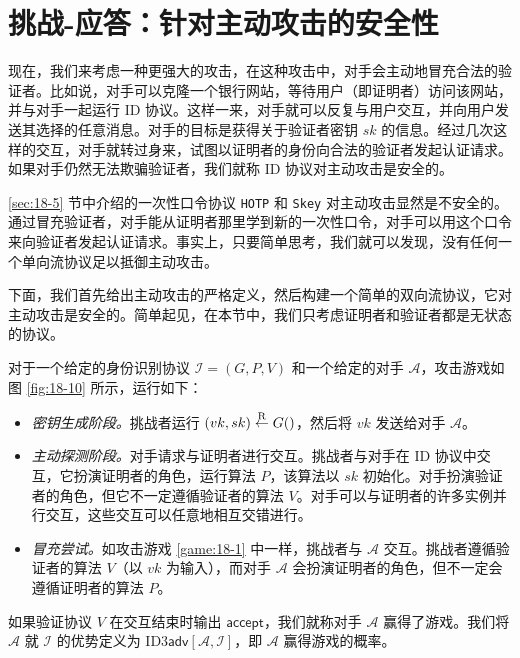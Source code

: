 \section{挑战-应答：针对主动攻击的安全性}\label{sec:18-6}


现在，我们来考虑一种更强大的攻击，在这种攻击中，对手会主动地冒充合法的验证者。比如说，对手可以克隆一个银行网站，等待用户（即证明者）访问该网站，并与对手一起运行 ID 协议。这样一来，对手就可以反复与用户交互，并向用户发送其选择的任意消息。对手的目标是获得关于验证者密钥 $sk$ 的信息。经过几次这样的交互，对手就转过身来，试图以证明者的身份向合法的验证者发起认证请求。如果对手仍然无法欺骗验证者，我们就称 ID 协议对主动攻击是安全的。

\ref{sec:18-5} 节中介绍的一次性口令协议 \texttt{HOTP} 和 \texttt{Skey} 对主动攻击显然是不安全的。通过冒充验证者，对手能从证明者那里学到新的一次性口令，对手可以用这个口令来向验证者发起认证请求。事实上，只要简单思考，我们就可以发现，没有任何一个单向流协议足以抵御主动攻击。

下面，我们首先给出主动攻击的严格定义，然后构建一个简单的双向流协议，它对主动攻击是安全的。简单起见，在本节中，我们只考虑证明者和验证者都是无状态的协议。

\begin{game}\label{game:18-3}
对于一个给定的身份识别协议 $\mathcal{I}=(G,P,V)$ 和一个给定的对手 $\mathcal{A}$，攻击游戏如图 \ref{fig:18-10} 所示，运行如下：
\begin{itemize}
	\item \emph{密钥生成阶段。}挑战者运行 $(vk,sk)\overset{\rm R}\leftarrow G()$，然后将 $vk$ 发送给对手 $\mathcal{A}$。
	\item \emph{主动探测阶段。}对手请求与证明者进行交互。挑战者与对手在 ID 协议中交互，它扮演证明者的角色，运行算法 $P$，该算法以 $sk$ 初始化。对手扮演验证者的角色，但它不一定遵循验证者的算法 $V$。对手可以与证明者的许多实例并行交互，这些交互可以任意地相互交错进行。
	\item \emph{冒充尝试。}如攻击游戏 \ref{game:18-1} 中一样，挑战者与 $\mathcal{A}$ 交互。挑战者遵循验证者的算法 $V$（以 $vk$ 为输入），而对手 $\mathcal{A}$ 会扮演证明者的角色，但不一定会遵循证明者的算法 $P$。
\end{itemize}
如果验证协议 $V$ 在交互结束时输出 $\mathsf{accept}$，我们就称对手 $\mathcal{A}$ 赢得了游戏。我们将 $\mathcal{A}$ 就 $\mathcal{I}$ 的优势定义为 $\mathrm{ID3}\mathsf{adv}[\mathcal{A}, \mathcal{I}]$，即 $\mathcal{A}$ 赢得游戏的概率。
\end{game}

